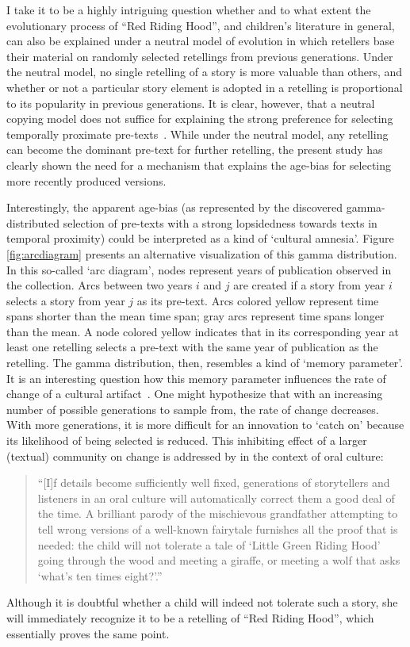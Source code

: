 I take it to be a highly intriguing question whether and to what extent the evolutionary process of ``Red Riding Hood'', and children's literature in general, can also be explained under a neutral model of evolution in which retellers base their material on randomly selected retellings from previous generations. Under the neutral model, no single retelling of a story is more valuable than others, and whether or not a particular story element is adopted in a retelling is proportional to its popularity in previous generations. It is clear, however, that a neutral copying model does not suffice for explaining the strong preference for selecting temporally proximate pre-texts~\autocite[Cf.][]{Acerbi:2012id}. While under the neutral model, any retelling can become the dominant pre-text for further retelling, the present study has clearly shown the need for a mechanism that explains the age-bias for selecting more recently produced versions.

Interestingly, the apparent age-bias (as represented by the discovered gamma-distributed selection of pre-texts with a strong lopsidedness towards texts in temporal proximity) could be interpreted as a kind of `cultural amnesia'. Figure \ref{fig:arcdiagram} presents an alternative visualization of this gamma distribution. In this so-called `arc diagram', nodes represent years of publication observed in the collection. Arcs between two years $i$ and $j$ are created if a story from year $i$ selects a story from year $j$ as its pre-text. Arcs colored yellow represent time spans shorter than the mean time span; gray arcs represent time spans longer than the mean. A node colored yellow indicates that in its corresponding year at least one retelling selects a pre-text with the same year of publication as the retelling. The gamma distribution, then, resembles a kind of `memory parameter'. It is an interesting question how this memory parameter influences the rate of change of a cultural artifact~\autocite[Cf.][]{Perreault:2012}. One might hypothesize that with an increasing number of possible generations to sample from, the rate of change decreases. With more generations, it is more difficult for an innovation to `catch on' because its likelihood of being selected is reduced. This inhibiting effect of a larger (textual) community on change is addressed by \citeauthor{Anderson:2000} in the context of oral culture:
\begin{quotation}
    \noindent ``[I]f details become sufficiently well fixed, generations of storytellers and listeners in an oral culture will automatically correct them a good deal of the time. A brilliant parody of the mischievous grandfather attempting to tell wrong versions of a well-known fairytale furnishes all the proof that is needed: the child will not tolerate a tale of `Little Green Riding Hood' going through the wood and meeting a giraffe, or meeting a wolf that asks `what's ten times eight?'.''\autocite[19]{Anderson:2000}
\end{quotation}
Although it is doubtful whether a child will indeed not tolerate such a story, she will immediately recognize it to be a retelling of ``Red Riding Hood'', which essentially proves the same point. 

